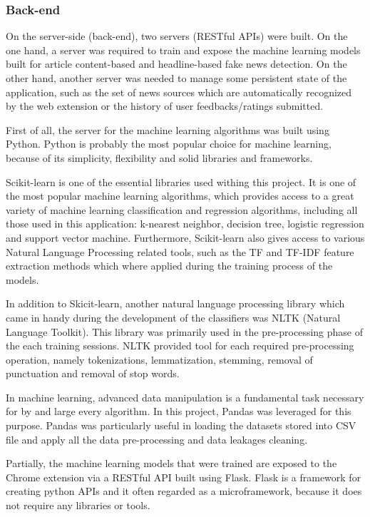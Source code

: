 \subsubsection{Back-end}
  On the server-side (back-end), two servers (RESTful APIs) were built. On the one hand, a server was required to train and expose the machine learning models built for article content-based and headline-based fake news detection. On the other hand, another server was needed to manage some persistent state of the application, such as the set of news sources which are automatically recognized by the web extension or the history of user feedbacks/ratings submitted.

  First of all, the server for the machine learning algorithms was built using Python. Python is probably the most popular choice for machine learning, because of its simplicity, flexibility and solid libraries and frameworks.

  Scikit-learn is one of the essential libraries used withing this project. It is one of the most popular machine learning algorithms, which provides access to a great variety of machine learning classification and regression algorithms, including all those used in this application: k-nearest neighbor, decision tree, logistic regression and support vector machine. Furthermore, Scikit-learn also gives access to various Natural Language Processing related tools, such as the TF and TF-IDF feature extraction methods which where applied during the training process of the models.
  
  In addition to Skicit-learn, another natural language processing library which came in handy during the development of the classifiers was NLTK (Natural Language Toolkit). This library was primarily used in the pre-processing phase of the each training sessions. NLTK provided tool for each required pre-processing operation, namely tokenizations, lemmatization, stemming, removal of punctuation and removal of stop words.

  In machine learning, advanced data manipulation is a fundamental task necessary for by and large every algorithm. In this project, Pandas was leveraged for this purpose. Pandas was particularly useful in loading the datasets stored into CSV file and apply all the data pre-processing and data leakages cleaning.

  Partially, the machine learning models that were trained are exposed to the Chrome extension via a RESTful API built using Flask. Flask is a framework for creating python APIs and it often regarded as a microframework, because it does not require any libraries or tools. 

